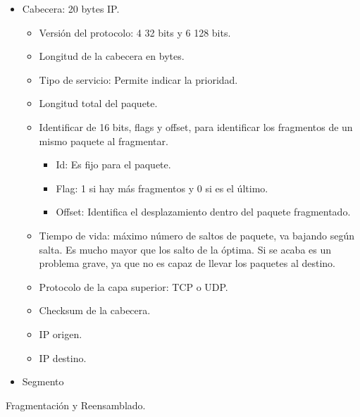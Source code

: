 \documentclass[12pt, twoside, openright]{report} %
\begin{document}
\begin{itemize}
	\item Cabecera: 20 bytes IP.

	      \begin{itemize}
		      \item Versión del protocolo: 4 32 bits y 6 128 bits.
		      \item Longitud de la cabecera en bytes.
		      \item Tipo de servicio: Permite indicar la prioridad.
		      \item Longitud total del paquete.
		      \item Identificar de 16 bits, flags y offset, para identificar los
		            fragmentos de un mismo paquete al fragmentar.

		            \begin{itemize}
			            \item Id: Es fijo para el paquete.
			            \item Flag: 1 si hay más fragmentos y 0 si es el último.
			            \item Offset: Identifica el desplazamiento dentro del paquete
			                  fragmentado.
		            \end{itemize}
		      \item Tiempo de vida: máximo número de saltos de paquete, va bajando
		            según salta. Es mucho mayor que los salto de la óptima. Si se
		            acaba es un problema grave, ya que no es capaz de llevar los
		            paquetes al destino.
		      \item Protocolo de la capa superior: TCP o UDP.
		      \item Checksum de la cabecera.
		      \item IP origen.
		      \item IP destino.
	      \end{itemize}
	\item Segmento
\end{itemize}

Fragmentación y Reensamblado.
\end{document}
